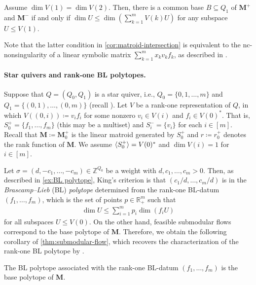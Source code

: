 \documentclass[a4paper,11pt]{article}
\numberwithin{equation}{section}
\newcommand{\R}{\mathbb{R}}
\newcommand{\Z}{\mathbb{Z}}
\newcommand{\M}{\mathbf{M}}
\DeclarePairedDelimiter{\spnn}{\langle}{\rangle}
\begin{document}
\begin{corollary}\label{cor:matroid-intersection}
  Assume $\dim V(1) = \dim V(2)$.
  Then, there is a common base $B \subseteq Q_1$ of $\M^+$ and $\M^-$ if and only if $\dim U \le \dim(\sum_{k=1}^m V(k) U)$ for any subspace $U \le V(1)$.
\end{corollary}

Note that the latter condition in \cref{cor:matroid-intersection} is equivalent to the nc-nonsingularity of a linear symbolic matrix $\sum_{k=1}^m x_k v_k f_k$, as described in .


\paragraph{Star quivers and rank-one BL polytopes.}

Suppose that $Q = (Q_0, Q_1)$ is a star quiver, i.e.,
$Q_0 = \{ 0,1, \dots, m \}$ and $Q_1 = \{ (0,1), \dots, (0,m) \}$
(recall ).
Let $V$ be a rank-one representation of $Q$, in which
$V((0,i)) \coloneqq v_i f_i$ for some nonzero $v_i \in V(i)$ and $f_i \in V(0)^*$.
That is,
$S_0^+ = \{ f_1, \dots, f_m \}$ (this may be a multiset) and $S_i^- = \{ v_i \}$ for each $i \in [m]$.
Recall that $\M \coloneqq \M_0^+$ is the linear matroid generated by $S_0^+$ and $r \coloneqq r_0^+$ denotes the rank function of $\M$.
We assume $\spnn{S_0^+} = V(0)^*$ and $\dim V(i) = 1$ for $i \in [m]$.

Let $\sigma = (d, -c_1, \dotsc, -c_m) \in \Z^{Q_0}$ be a weight with $d, c_1, \dotsc, c_m > 0$.
Then, as described in \cref{ex:BL polytope}, King's criterion is that $(c_1/d, \dots, c_m/d)$ is in the \emph{Brascamp--Lieb} (BL) \emph{polytope} determined from the rank-one BL-datum $(f_1, \dots, f_m)$, which is the set of points $p \in \R_+^m$ such that
\begin{align}
    \dim U \le \sum_{i=1}^m p_i \dim (f_i U)
\end{align}
for all subspaces $U \le V(0)$.
On the other hand, feasible submodular flows correspond to the base polytope of $\mathbf{M}$.
Therefore, we obtain the following corollary of \cref{thm:submodular-flow}, which recovers the characterization of the rank-one BL polytope by \citet{Barthe1998}.

\begin{corollary}
    The BL polytope associated with the rank-one BL-datum $(f_1, \dots, f_m)$ is the base polytope of $\mathbf{M}$.
\end{corollary}
\end{document}
